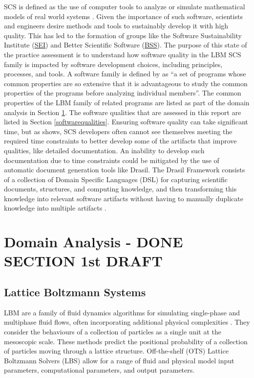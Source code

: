 \documentclass[12pt, notitlepage]{article}
\begin{document}
SCS is defined as the use of computer tools to analyze or simulate mathematical models of real world systems \citep{smith2006systematic}. Given the importance of such software, scientists and engineers desire methods and tools to sustainably develop it with high quality. This has led to the formation of groups like the Software Sustainability Institute (\href{https://www.software.ac.uk/}{SEI}) and Better Scientific Software (\href{https://bssw.io/}{BSS}). The purpose of this state of the practice assessment is to understand how software quality in the LBM SCS family is impacted by software development choices, including principles, processes, and tools. A software family is defined
by \cite{parnas1976design} as “a set of programs whose common properties are so extensive that it is advantageous to study the common properties of the programs before analyzing individual members”. The common properties of the LBM family of related programs are listed as part of the domain analysis in Section \ref{domainanalysis}. The software qualities that are assessed in this report are listed in Section \ref{softwarequalities}. Ensuring software quality can take significant time, but as \cite{SmithEtAl2016} shows, SCS developers often cannot see themselves meeting the required time constraints to better develop some of the artifacts that improve qualities, like detailed documentation. An inability to develop such documentation due to time constraints could be mitigated by the use of automatic document generation tools like Drasil. The Drasil Framework consists of a collection of Domain Specific Languages (DSL) for capturing scientific documents, structures, and computing
knowledge, and then transforming this knowledge into relevant software artifacts without having to manually duplicate knowledge into multiple artifacts \citep{zhao2018}.

\newpage

\section{Domain Analysis - DONE SECTION 1st DRAFT}\label{domainanalysis}

\subsection{Lattice Boltzmann Systems}

LBM are a family of fluid dynamics algorithms for simulating single-phase and multiphase fluid flows, often incorporating additional physical complexities \citep{chen1998lattice}. They consider the behaviours of a collection of particles as a single unit at the mesoscopic scale. These methods predict the positional probability of a collection of particles moving through a lattice structure. Off-the-shelf (OTS) Lattice Boltzmann Solvers (LBS) allow for a range of fluid and physical model input parameters, computational parameters, and output parameters.
\end{document}
